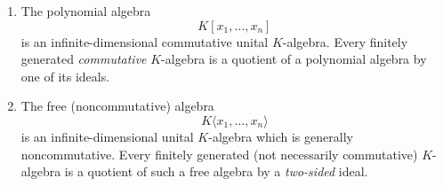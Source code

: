 \begin{proposition}\label{prop:poly-free}
\leavevmode
\begin{enumerate}
    \item The polynomial algebra
    \[
    K[x_1,\dots,x_n]
    \]
    is an infinite-dimensional commutative unital $K$-algebra.  
    Every finitely generated \emph{commutative} $K$-algebra is a quotient of a polynomial algebra by one of its ideals.

    \item The free (noncommutative) algebra
    \[
    K\langle x_1,\dots,x_n\rangle
    \]
    is an infinite-dimensional unital $K$-algebra which is generally noncommutative.  
    Every finitely generated (not necessarily commutative) $K$-algebra is a quotient of such a free algebra by a \emph{two-sided} ideal.
\end{enumerate}
\end{proposition}

